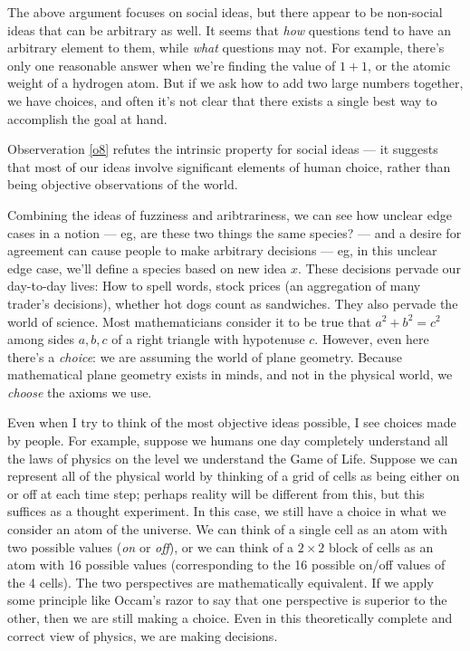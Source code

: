 \documentclass[11pt, oneside]{article}   	%
\begin{document}

The above argument focuses on social ideas, but there appear to be
non-social ideas that can be arbitrary as well.
It seems that {\em how} questions tend to have an arbitrary element
to them, while {\em what} questions may not.
For example, there's only one reasonable answer when we're finding
the value of $1+1$,
or the
atomic weight of a hydrogen atom. But if we ask how to add two large numbers
together, we have choices, and often it's not clear that there exists a single
best way to accomplish the goal at hand.

Observeration \ref{o8} refutes the intrinsic property for social ideas --- it
suggests that most of our ideas involve significant elements of human choice,
rather than being objective observations of the world.


Combining the ideas of fuzziness and aribtrariness, we can see how unclear edge
cases in a notion --- eg, are these two things the same species? ---
and a desire for agreement
can cause people to make arbitrary decisions --- eg, in this unclear edge case,
we'll
define a species based on new idea $x$.
These decisions pervade our day-to-day lives: How to spell words, stock prices
(an aggregation of many trader's decisions), whether hot dogs count as
sandwiches.
They also pervade the world of science.
Most mathematicians consider it to be true that $a^2+b^2=c^2$ among sides
$a,b,c$ of a right triangle with hypotenuse $c$. However, even here there's
a {\em choice}\/: we are assuming the world of plane geometry. Because
mathematical plane geometry exists in minds, and not in the physical world,
we {\em choose} the axioms we use.

Even when I try to think of the most objective ideas possible, I see choices
made by people. For example, suppose we humans one day completely understand all
the laws of physics on the level we understand the Game of Life.
Suppose we can represent all of the physical world by thinking of a grid of
cells as being either on or off at each time step; perhaps reality will be
different from this, but this suffices as a thought experiment.
In this case, we still have a choice in what we consider an atom of the
universe. We can think of a single cell as an atom with two possible values
({\em on} or {\em off}\/), or we can think of a $2\times 2$
block of cells as an atom with 16 possible values (corresponding to the 16
possible on/off values of the 4 cells). The two perspectives are mathematically
equivalent. If we apply some principle like Occam's razor to say
that one perspective is superior
to the other, then we are still making a choice. Even in this theoretically
complete and correct view of physics, we are making decisions.
\end{document}
